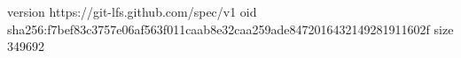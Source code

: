 version https://git-lfs.github.com/spec/v1
oid sha256:f7bef83c3757e06af563f011caab8e32caa259ade8472016432149281911602f
size 349692
